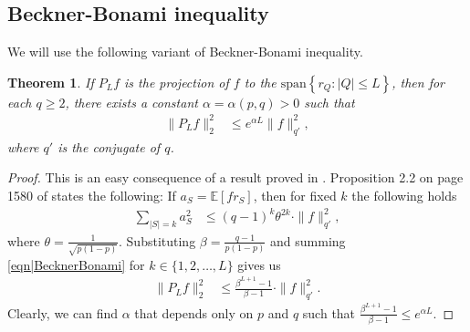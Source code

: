 \documentclass[reqno]{amsart}
\newtheorem{theorem}{Theorem}
\begin{document}
\subsection{Beckner-Bonami inequality}
We will use the following variant of Beckner-Bonami inequality. 
\begin{theorem}\label{thm|Beckner} 
If $P_Lf$ is the projection of $f$ to the $\text{span} \left\{r_Q: |Q|\leq L\right\}$, then for each $q\geq 2$, there exists a constant $\alpha=\alpha(p,q)>0$ such that
\begin{align*}\|P_Lf\|_2^2&\leq e^{\alpha L}\|f\|_{q'}^2,
\end{align*}
where $q'$ is the conjugate of $q$.
\end{theorem}
\begin{proof} This is an easy consequence of  a result proved in \cite{talagrand1994}. Proposition 2.2 on page 1580 of \cite{talagrand1994} states the following:
If $a_S=\mathbb E[fr_S]$, then for fixed $k$ the following holds
\begin{align}
\sum_{|S|=k} a_S^2 &\leq (q-1)^k\theta^{2k}\cdot \|f\|_{q'}^2, \label{eqn|BecknerBonami}
\end{align}
where $\theta=\frac1{\sqrt{p(1-p)}}$.
Substituting $\beta=\frac{q-1}{ p(1-p) }$ and summing \eqref{eqn|BecknerBonami} for $k\in\{1,2,\dots, L\}$ gives us 
\begin{align*}
\|P_Lf\|_2^2&\leq \frac{\beta^{L+1}-1}{\beta-1}\cdot \|f\|_{q'}^2.
\end{align*}
Clearly, we can find $\alpha$ that depends only on $p$ and $q$ such that $\frac{\beta^{L+1}-1}{\beta-1}\leq e^{\alpha L}$. 
\end{proof}
  
\end{document}
